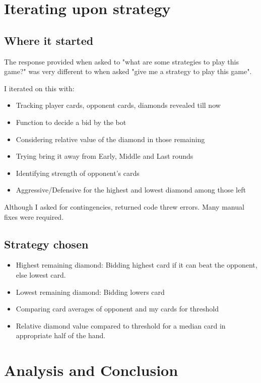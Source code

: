 \documentclass[runningheads]{llncs}
\begin{document}
\section{Iterating upon strategy}
\subsection{Where it started}
The response provided when asked to "what are some strategies to play this game?"\cite{ref_strategies} was very different to when asked "give me a strategy to play this game"\cite{ref_a_strategy}. 

I iterated on this with\cite{ref_strategy_chat_link}:
\begin{itemize}
    \item Tracking player cards, opponent cards, diamonds revealed till now
    \item Function to decide a bid by the bot
    \item Considering relative value of the diamond in those remaining
    \item Trying bring it away from Early, Middle and Last rounds
    \item Identifying strength of opponent's cards
    \item Aggressive/Defensive for the highest and lowest diamond among those left
\end{itemize}
Although I asked for contingencies, returned code threw errors. Many manual fixes were required.

\subsection{Strategy chosen}
\begin{itemize}
    \item Highest remaining diamond: Bidding highest card if it can beat the opponent, else lowest card.
    \item Lowest remaining diamond: Bidding lowers card
    \item Comparing card averages of opponent and my cards for threshold
    \item Relative diamond value compared to threshold for a median card in appropriate half of the hand.
\end{itemize}

\section{Analysis and Conclusion}
\end{document}
